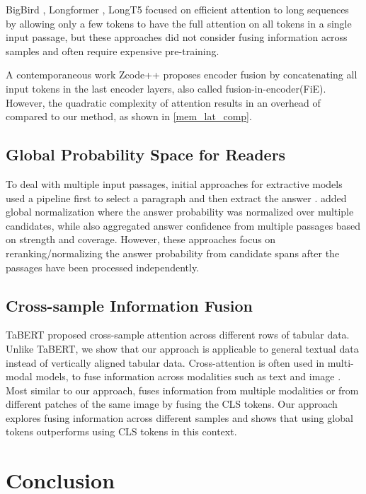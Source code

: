 \documentclass[11pt]{article}
\begin{document}
BigBird \cite{bigbird}, Longformer \cite{longformer}, LongT5 \cite{longt5} focused on efficient attention to long sequences by allowing only a few tokens to have the full attention on all tokens in a single input passage, but these approaches did not consider fusing information across samples and often require expensive pre-training. 

A contemporaneous work Zcode++ \cite{zcode_plus_plus} proposes encoder fusion by concatenating all input tokens in the last encoder layers, also called fusion-in-encoder(FiE). However, the quadratic complexity of attention results in an overhead of  compared to our method, as shown in \cref{mem_lat_comp}.

\subsection{Global Probability Space for Readers}

To deal with multiple input passages, initial approaches for extractive models used a pipeline first to select a paragraph and then extract the answer \cite{realm, dpr, ance}. \cite{clark-gardner-2018-simple, wang-etal-2019-multi} added global normalization where the answer probability was normalized over multiple candidates, while \cite{wang2018evidence} also aggregated answer confidence from multiple passages based on strength and coverage. However, these approaches focus on reranking/normalizing the answer probability from candidate spans after the passages have been processed independently.

\subsection{Cross-sample Information Fusion}

TaBERT \cite{tabert} proposed cross-sample attention across different rows of tabular data. Unlike TaBERT, we show that our approach is applicable to general textual data instead of vertically aligned tabular data. Cross-attention is often used in multi-modal models, to fuse information across modalities such as text and image \cite{cross_attention_1, cross_attention_2}. Most similar to our approach, \citet{vision_fusion} fuses information from multiple modalities or from different patches of the same image by fusing the CLS tokens. Our approach explores fusing information across different samples and shows that using global tokens outperforms using CLS tokens in this context.
 \section{Conclusion}
\end{document}
